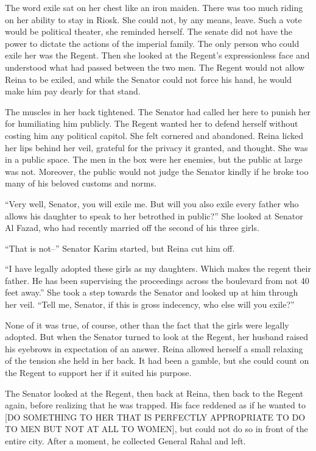 \documentclass{article}
\begin{document}
	The word exile sat on her chest like an iron maiden. There was too much riding on her ability to stay in Riosk. She could not, by any means, leave. Such a vote would be political theater, she reminded herself. The senate did not have the power to dictate the actions of the imperial family. The only person who could exile her was the Regent. Then she looked at the Regent’s expressionless face and understood what had passed between the two men. The Regent would not allow Reina to be exiled, and while the Senator could not force his hand, he would make him pay dearly for that stand. 
	
	The muscles in her back tightened. The Senator had called her here to punish her for humiliating him publicly. The Regent wanted her to defend herself without costing him any political capitol. She felt cornered and abandoned. Reina licked her lips behind her veil, grateful for the privacy it granted, and thought. She was in a public space. The men in the box were her enemies, but the public at large was not. Moreover, the public would not judge the Senator kindly if he broke too many of his beloved customs and norms. 
	
	“Very well, Senator, you will exile me. But will you also exile every father who allows his daughter to speak to her betrothed in public?” She looked at Senator Al Fazad, who had recently married off the second of his three girls.
	
	“That is not–” Senator Karim started, but Reina cut him off. 
	
	“I have legally adopted these girls as my daughters. Which makes the regent their father. He has been supervising the proceedings across the boulevard from not 40 feet away.” She took a step towards the Senator and looked up at him through her veil. “Tell me, Senator, if this is gross indecency, who else will you exile?”
	
	None of it was true, of course, other than the fact that the girls were legally adopted. But when the Senator turned to look at the Regent, her husband raised his eyebrows in expectation of an answer. Reina allowed herself a small relaxing of the tension she held in her back. It had been a gamble, but she could count on the Regent to support her if it suited his purpose. 
	
	The Senator looked at the Regent, then back at Reina, then back to the Regent again, before realizing that he was trapped. His face reddened as if he wanted to [DO SOMETHING TO HER THAT IS PERFECTLY APPROPRIATE TO DO TO MEN BUT NOT AT ALL TO WOMEN], but could not do so in front of the entire city. After a moment, he collected General Rahal and left.
	
\end{document}
